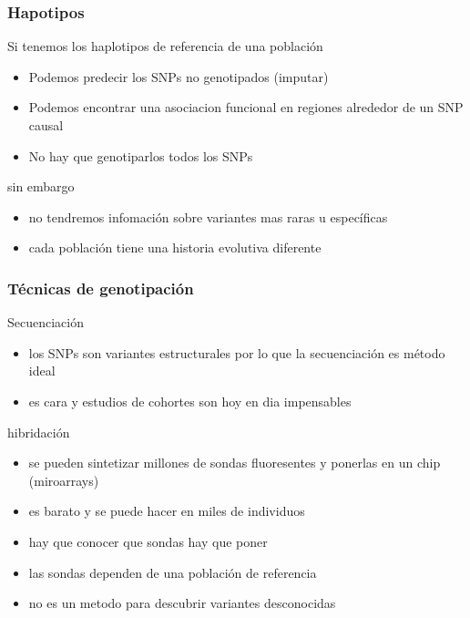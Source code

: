 \documentclass{beamer}\usepackage[]{graphicx}\usepackage[]{color}
\begin{document}
\begin{frame}[fragile] 
\frametitle{Hapotipos}

Si tenemos los haplotipos de referencia de una poblaci\'on
\begin{itemize}
\item Podemos predecir los SNPs no genotipados (imputar)
\item Podemos encontrar una asociacion funcional en regiones alrededor de un SNP causal
\item No hay que genotiparlos todos los SNPs
\end{itemize}

sin embargo
\begin{itemize}
\item no tendremos infomaci\'on sobre variantes mas raras u espec\'ificas
\item cada poblaci\'on tiene una historia evolutiva diferente
\end{itemize}

\end{frame}



\begin{frame}[fragile] 
\frametitle{T\'ecnicas de genotipaci\'on}

Secuenciaci\'on
\begin{itemize}
\item los SNPs son variantes estructurales por lo que la secuenciación es método ideal
\item es cara y estudios de cohortes son hoy en dia impensables
\end{itemize}

hibridaci\'on
\begin{itemize}
\item se pueden sintetizar millones de sondas fluoresentes y ponerlas en un chip (miroarrays)
\item es barato y se puede hacer en miles de individuos
\item hay que conocer que sondas hay que poner
\item las sondas dependen de una poblaci\'on de referencia 
\item no es un metodo para descubrir variantes desconocidas
\end{itemize}

\end{frame}
\end{document}
